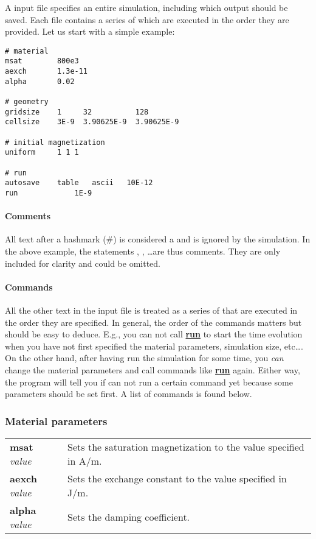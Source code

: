 A \prog input file specifies an entire simulation, including which output should be saved. Each file contains a series of  which are executed in the order they are provided. Let us start with a simple example:


\begin{verbatim}
# material
msat       	800e3 
aexch      	1.3e-11
alpha      	0.02

# geometry 
gridsize 	1     32          128    
cellsize   	3E-9  3.90625E-9  3.90625E-9

# initial magnetization
uniform		1 1 1

# run
autosave	table	ascii	10E-12
run          	1E-9
\end{verbatim}

\newcommand{\defcommand}[2][\space]{\textbf{#2}\index{#2}\label{#2} \textit{#1}}
\newcommand{\command}[1]{\hyperref[#1]{\textbf{#1}}\index{#1}\label{#1}}

\paragraph{Comments} All text after a hashmark (\#) is considered a  and is ignored by the simulation. In the above example, the statements , , \ldots are thus comments. They are only included for clarity and could be omitted.

\paragraph{Commands} All the other text in the input file is treated as a series of  that are executed in the order they are specified. In general, the order of the commands matters but should be easy to deduce.  E.g., you can not call \command{run} to start the time evolution when you have not first specified the material parameters, simulation size, etc\ldots. On the other hand, after having {run} the simulation for some time, you \emph{can} change the material parameters and call commands like \command{run} again. Either way, the program will tell you if can not run a certain command yet because some parameters should be set first. A list of commands is found below.

\subsubsection*{Material parameters}
\begin{tabular}{ll}
\defcommand[value]{msat}  & Sets the saturation magnetization to the value specified in A/m. \\
\defcommand[value]{aexch} & Sets the exchange constant to the value specified in J/m. \\
\defcommand[value]{alpha} & Sets the damping coefficient.
\end{tabular}

